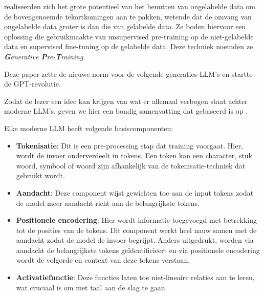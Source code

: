 \textcite{Radford2018} realiseerden zich het grote potentieel van het benutten van ongelabelde data om de bovengenoemde tekortkomingen aan te pakken, wetende dat de omvang van ongelabelde data groter is dan die van gelabelde data. Ze boden hiervoor een oplossing die gebruikmaakte van unsupervised pre-training op de niet-gelabelde data en supervised fine-tuning op de gelabelde data. Deze techniek noemden ze \emph{\textbf{G}enerative \textbf{P}re-\textbf{T}raining}.

Deze paper zette de nieuwe norm voor de volgende generaties \acrshort{LLM}'s en startte de GPT-revolutie.
 
Zodat de lezer een idee kan krijgen van wat er allemaal verbogen staat achter moderne \acrshort{LLM}'s, geven we hier een bondig samenvatting dat gebaseerd is op \textcite{Naveed2023}.

Elke moderne \acrshort{LLM} heeft volgende basiscomponenten: 
\begin{itemize} 
    \item \textbf{Tokenisatie}: Dit is een pre-processing stap dat training voorgaat. Hier, wordt de invoer onderverdeelt in tokens. Een token kan een character, stuk woord, symbool of woord zijn afhankelijk van de tokenisatie-techniek dat gebruikt wordt.
    \item \textbf{Aandacht}: Deze component wijst gewichten toe aan de input tokens zodat de model meer aandacht richt aan de belangrijkste tokens.
    \item \textbf{Positionele encodering}: Hier wordt informatie toegevoegd met betrekking tot de posities van de tokens. Dit component werkt heel nauw samen met de aandacht zodat de model de invoer begrijpt. Anders uitgedrukt, worden via aandacht de belangrijkste tokens geïdentificieert en via positionele encodering wordt de volgorde en context van deze tokens verstaan.
    \item \textbf{Activatiefunctie}: Deze functies laten toe niet-lineaire relaties aan te leren, wat cruciaal is om met taal aan de slag te gaan.
\end{itemize}

